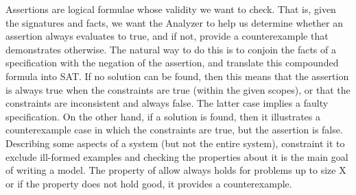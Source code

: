 \documentclass[a4paper,12pt]{extarticle}
\begin{document}
{Assertions are logical formulae whose validity we want to check. That is, given the signatures and facts, we want the Analyzer to help us determine whether an assertion always evaluates to true, and if not, provide a counterexample that demonstrates otherwise. The natural way to do this is to conjoin the facts of a specification with the negation of the assertion, and translate this compounded formula into SAT\cite{Strichman}. If no solution can be found, then this means that the assertion is always true when the constraints are true (within the given scopes), or that the constraints are inconsistent and always false. The latter case implies a faulty specification. On the other hand, if a solution is found, then it illustrates a counterexample case in which the constraints are true, but the assertion is false. 
Describing some aspects of a system (but not the entire system), constraint it to exclude ill-formed examples and checking the properties about it is the main goal of writing a model. The property of allow always holds for problems up to size X or if the property does not hold good, it provides a counterexample. \cite{Yeung2005}

}
\end{document}
